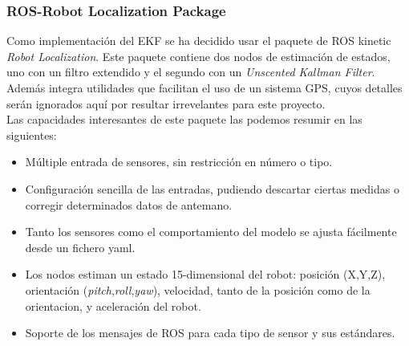 \subsubsection{ROS-Robot Localization Package}
Como implementación del EKF se ha decidido usar el paquete de ROS kinetic \textit{Robot Localization}\cite{MooreStouchKeneralizedEkf2014}. Este paquete contiene dos nodos de estimación de estados, uno con un filtro extendido y el segundo con un \textit{Unscented Kallman Filter}. Además integra utilidades que facilitan el uso de un sistema GPS, cuyos detalles serán ignorados aquí por resultar irrevelantes para este proyecto.\\
Las capacidades interesantes de este paquete las podemos resumir en las siguientes:
\begin{itemize}
	\item Múltiple entrada de sensores, sin restricción en número o tipo.
	\item Configuración sencilla de las entradas, pudiendo descartar ciertas medidas o corregir determinados datos de antemano.
	\item Tanto los sensores como el comportamiento del modelo se ajusta fácilmente desde un fichero yaml.
	\item Los nodos estiman un estado 15-dimensional del robot: posición (X,Y,Z), orientación (\textit{pitch},\textit{roll},\textit{yaw}), velocidad, tanto de la posición como de la orientacion, y aceleración del robot.
	\item Soporte de los mensajes de ROS para cada tipo de sensor y sus estándares.
\end{itemize} 

\newpage


